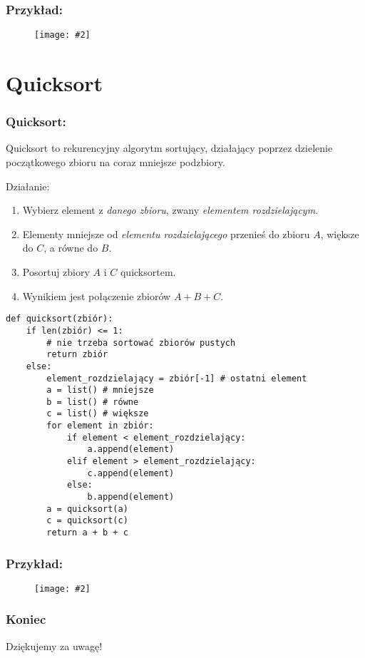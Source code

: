 \documentclass{beamer}
\newcommand{\obrazek}[2]{
        \begin{figure}[h]
            \centering
            \texttt{[image: \#2]}
        \end{figure}
    }
\begin{document}
\begin{frame}
    \frametitle{Przykład:}
    \obrazek{.5}{binarySearchExample.png}
\end{frame}

\section{Quicksort}
\begin{frame}
    \frametitle{Quicksort:}
    Quicksort to rekurencyjny algorytm sortujący, działający poprzez dzielenie początkowego zbioru na coraz mniejsze podzbiory.
    \vspace{5mm}

    Działanie:
    \begin{enumerate}
        \item Wybierz element z \emph{danego zbioru}, zwany \emph{elementem rozdzielającym.}
        \item Elementy mniejsze od \emph{elementu rozdzielającego} przenieś do zbioru $A$, większe do $C$, a równe do $B$.
        \item Posortuj zbiory $A$ i $C$ quicksortem.
        \item Wynikiem jest połączenie zbiorów $A + B + C$.
    \end{enumerate}
\end{frame}

\begin{verbatim}
def quicksort(zbiór):
    if len(zbiór) <= 1:
        # nie trzeba sortować zbiorów pustych 
        return zbiór
    else:
        element_rozdzielający = zbiór[-1] # ostatni element
        a = list() # mniejsze
        b = list() # równe
        c = list() # większe
        for element in zbiór:
            if element < element_rozdzielający:
                a.append(element)
            elif element > element_rozdzielający:
                c.append(element)
            else:
                b.append(element)
        a = quicksort(a)
        c = quicksort(c)
        return a + b + c
\end{verbatim}

\begin{frame}
    \frametitle{Przykład:}
    \obrazek{.5}{quicksortExample.png}
\end{frame}

\begin{frame}
    \frametitle{Koniec}
    \begin{center}
        Dziękujemy za uwagę!
    \end{center}
\end{frame}
\end{document}
